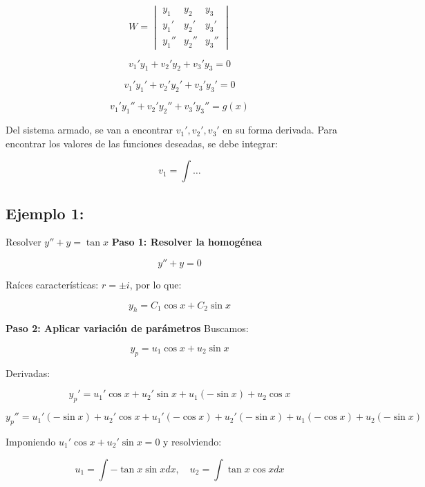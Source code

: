 \[
W =
\begin{vmatrix}
y_1 & y_2 & y_3 \\
y_1' & y_2' & y_3' \\
y_1'' & y_2'' & y_3''
\end{vmatrix}
\]

\[
v_1' y_1 + v_2' y_2 + v_3' y_3 = 0
\]

\[
v_1' y_1' + v_2' y_2' + v_3' y_3' = 0
\]

\[
v_1' y_1'' + v_2' y_2'' + v_3' y_3'' = g(x)
\]

Del sistema armado, se van a encontrar \( v_1', v_2', v_3' \) en su forma derivada. Para encontrar los valores de las funciones deseadas, se debe integrar:

\[
v_1 = \int \dots
\]


\subsection{Ejemplo 1:} Resolver \( y'' + y = \tan x \)
\textbf{Paso 1: Resolver la homogénea}

\begin{equation}
y'' + y = 0
\end{equation}

Raíces características: \( r = \pm i \), por lo que:

\begin{equation}
y_h = C_1 \cos x + C_2 \sin x
\end{equation}

\textbf{Paso 2: Aplicar variación de parámetros}
Buscamos:

\begin{equation}
y_p = u_1 \cos x + u_2 \sin x
\end{equation}

Derivadas:

\begin{equation}
y_p' = u_1' \cos x + u_2' \sin x + u_1 (-\sin x) + u_2 \cos x
\end{equation}

\begin{equation}
y_p'' = u_1' (-\sin x) + u_2' \cos x + u_1' (-\cos x) + u_2' (-\sin x) + u_1 (-\cos x) + u_2 (-\sin x)
\end{equation}

Imponiendo \( u_1' \cos x + u_2' \sin x = 0 \) y resolviendo:

\begin{equation}
u_1 = \int -\tan x \sin x dx, \quad u_2 = \int \tan x \cos x dx
\end{equation}

